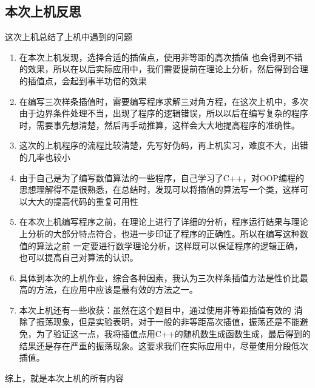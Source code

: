 \documentclass[10pt,a4paper]{ctexart}
\begin{document}
\subsection{本次上机反思}
这次上机总结了上机中遇到的问题
\begin{enumerate}
\item 在本次上机发现，选择合适的插值点，使用非等距的高次插值
也会得到不错的效果，所以在以后实际应用中，我们需要提前在理论上分析，然后得到合理的插值点，会起到事半功倍的效果
\item 在编写三次样条插值时，需要编写程序求解三对角方程，在这次上机中，多次由于边界条件处理不当，出现了程序的逻辑错误，所以以后在编写复杂的程序时，需要事先想清楚，然后再手动推算，这样会大大地提高程序的准确性。
\item 
这次的上机程序的流程比较清楚，先写好伪码，再上机实习，难度不大，出错的几率也较小
\item 
由于自己是为了编写数值算法的一些程序，自己学习了C++，对OOP编程的思想理解得不是很熟悉，在总结时，发现可以将插值的算法写一个类，这样可以大大的提高代码的重复可用性
\item 
在本次上机编写程序之前，在理论上进行了详细的分析，程序运行结果与理论上分析的大部分特点符合，也进一步印证了程序的正确性。所以在编写这种数值的算法之前
一定要进行数学理论分析，这样既可以保证程序的逻辑正确，也可以提高自己对算法的认识。
\item 
具体到本次的上机作业，综合各种因素，我认为三次样条插值方法是性价比最高的方法，在应用中应该是最有效的方法之一。
\item 
本次上机还有一些收获：虽然在这个题目中，通过使用非等距插值有效的
消除了振荡现象，但是实验表明，对于一般的非等距高次插值，振荡还是不能避免，为了验证这一点，我将插值点用C++的随机数生成函数生成，最后得到的结果还是存在严重的振荡现象。这要求我们在实际应用中，尽量使用分段低次插值。
\end{enumerate}

综上，就是本次上机的所有内容
\end{document}
